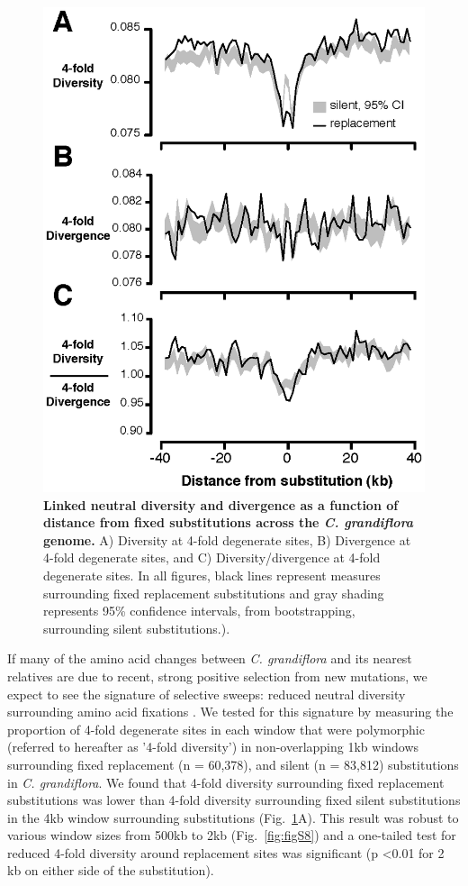 \begin{figure}[ht!]
      \centering
       \includegraphics{Ch2Fig2}
    \caption{\textbf{Linked neutral diversity and divergence as a function of distance from fixed substitutions across the \textit{C. grandiflora} genome.} A) Diversity at 4-fold degenerate sites, B) Divergence at 4-fold degenerate sites, and C) Diversity/divergence at 4-fold degenerate sites. In all figures, black lines represent measures surrounding fixed replacement substitutions and gray shading represents 95\% confidence intervals, from bootstrapping, surrounding silent substitutions.).}
    \label{fig:fig2}
\end{figure}

If many of the amino acid changes between \textit{C. grandiflora} and its nearest relatives are due to recent, strong positive selection from new mutations, we expect to see the signature of selective sweeps: reduced neutral diversity surrounding amino acid fixations \citep{Smith1974,Sattath2011-ns}. We tested for this signature by measuring the proportion of 4-fold degenerate sites in each window that were polymorphic (referred to hereafter as '4-fold diversity') in non-overlapping 1kb windows surrounding fixed replacement (n = 60,378), and silent (n = 83,812) substitutions in \textit{C. grandiflora}. We found that 4-fold diversity surrounding fixed replacement substitutions was lower than 4-fold diversity surrounding fixed silent substitutions in the 4kb window surrounding substitutions (Fig.~\ref{fig:fig2}A). This result was robust to various window sizes from 500kb to 2kb (Fig.~\ref{fig:figS8}) and a one-tailed test for reduced 4-fold diversity around replacement sites was significant (p \textless  0.01 for 2 kb on either side of the substitution).

